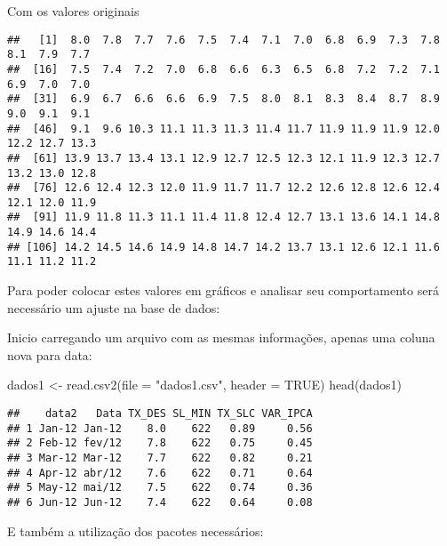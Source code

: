 \documentclass[
]{article}
\newenvironment{Shaded}{\begin{snugshade}}{\end{snugshade}}
\newcommand{\AttributeTok}[1]{\textcolor[rgb]{0.77,0.63,0.00}{#1}}
\newcommand{\ConstantTok}[1]{\textcolor[rgb]{0.00,0.00,0.00}{#1}}
\newcommand{\FunctionTok}[1]{\textcolor[rgb]{0.00,0.00,0.00}{#1}}
\newcommand{\NormalTok}[1]{#1}
\newcommand{\OtherTok}[1]{\textcolor[rgb]{0.56,0.35,0.01}{#1}}
\newcommand{\SpecialCharTok}[1]{\textcolor[rgb]{0.00,0.00,0.00}{#1}}
\newcommand{\StringTok}[1]{\textcolor[rgb]{0.31,0.60,0.02}{#1}}
\begin{document}
Com os valores originais

\begin{Shaded}
\end{Shaded}

\begin{verbatim}
##   [1]  8.0  7.8  7.7  7.6  7.5  7.4  7.1  7.0  6.8  6.9  7.3  7.8  8.1  7.9  7.7
##  [16]  7.5  7.4  7.2  7.0  6.8  6.6  6.3  6.5  6.8  7.2  7.2  7.1  6.9  7.0  7.0
##  [31]  6.9  6.7  6.6  6.6  6.9  7.5  8.0  8.1  8.3  8.4  8.7  8.9  9.0  9.1  9.1
##  [46]  9.1  9.6 10.3 11.1 11.3 11.3 11.4 11.7 11.9 11.9 11.9 12.0 12.2 12.7 13.3
##  [61] 13.9 13.7 13.4 13.1 12.9 12.7 12.5 12.3 12.1 11.9 12.3 12.7 13.2 13.0 12.8
##  [76] 12.6 12.4 12.3 12.0 11.9 11.7 11.7 12.2 12.6 12.8 12.6 12.4 12.1 12.0 11.9
##  [91] 11.9 11.8 11.3 11.1 11.4 11.8 12.4 12.7 13.1 13.6 14.1 14.8 14.9 14.6 14.4
## [106] 14.2 14.5 14.6 14.9 14.8 14.7 14.2 13.7 13.1 12.6 12.1 11.6 11.1 11.2 11.2
\end{verbatim}

Para poder colocar estes valores em gráficos e analisar seu
comportamento será necessário um ajuste na base de dados:

Inicio carregando um arquivo com as mesmas informações, apenas uma
coluna nova para data:

\begin{Shaded}
\begin{Highlighting}[]
\NormalTok{dados1 }\OtherTok{\textless{}{-}} \FunctionTok{read.csv2}\NormalTok{(}\AttributeTok{file =} \StringTok{"dados1.csv"}\NormalTok{, }\AttributeTok{header =} \ConstantTok{TRUE}\NormalTok{)}
\FunctionTok{head}\NormalTok{(dados1)}
\end{Highlighting}
\end{Shaded}

\begin{verbatim}
##    data2   Data TX_DES SL_MIN TX_SLC VAR_IPCA
## 1 Jan-12 Jan-12    8.0    622   0.89     0.56
## 2 Feb-12 fev/12    7.8    622   0.75     0.45
## 3 Mar-12 Mar-12    7.7    622   0.82     0.21
## 4 Apr-12 abr/12    7.6    622   0.71     0.64
## 5 May-12 mai/12    7.5    622   0.74     0.36
## 6 Jun-12 Jun-12    7.4    622   0.64     0.08
\end{verbatim}

E também a utilização dos pacotes necessários:
\end{document}
